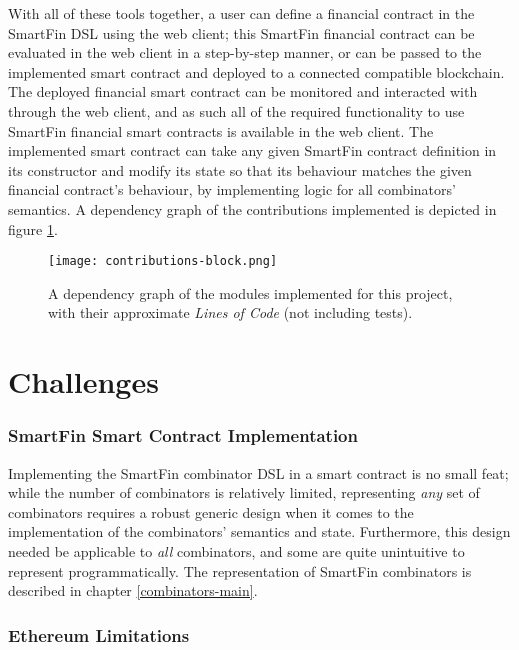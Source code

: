 With all of these tools together, a user can define a financial contract in the SmartFin DSL using the web client; this SmartFin financial contract can be evaluated in the web client in a step-by-step manner, or can be passed to the implemented smart contract and deployed to a connected compatible blockchain. The deployed financial smart contract can be monitored and interacted with through the web client, and as such all of the required functionality to use SmartFin financial smart contracts is available in the web client. The implemented smart contract can take any given SmartFin contract definition in its constructor and modify its state so that its behaviour matches the given financial contract's behaviour, by implementing logic for all combinators' semantics. A dependency graph of the contributions implemented is depicted in figure \ref{fig:contributions-block}. \\

\begin{figure}[h]
    \centering
    \texttt{[image: contributions-block.png]}
    \caption{A dependency graph of the modules implemented for this project, with their approximate \textit{Lines of Code} (not including tests).}
    \label{fig:contributions-block}
\end{figure}


\section{Challenges}

\subsubsection{SmartFin Smart Contract Implementation}

Implementing the SmartFin combinator DSL in a smart contract is no small feat; while the number of combinators is relatively limited, representing \textit{any} set of combinators requires a robust generic design when it comes to the implementation of the combinators' semantics and state. Furthermore, this design needed be applicable to \textit{all} combinators, and some are quite unintuitive to represent programmatically. The representation of SmartFin combinators is described in chapter \ref{combinators-main}.

\subsubsection{Ethereum Limitations}


